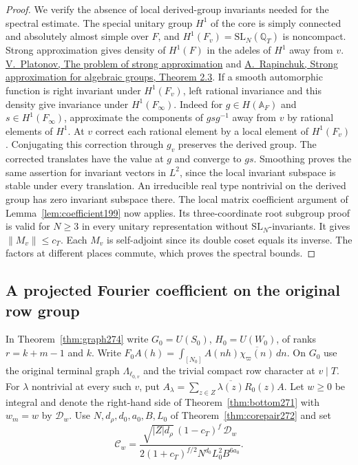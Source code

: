 \documentclass[a4paper,11pt]{article}
\theoremstyle{definition}
\theoremstyle{remark}
\numberwithin{equation}{section}
\begin{document}
\begin{proof}
We verify the absence of local derived-group invariants needed
for the spectral estimate. The special unitary group \(H^1\) of
the core is simply connected and absolutely almost simple over
\(F\), and \(H^1(F_v)=\mathrm{SL}_N(\mathbb Q_T)\) is noncompact.
Strong approximation gives density of \(H^1(F)\) in the adeles
of \(H^1\) away from \(v\).
\href{https://doi.org/10.1070/IM1969v003n06ABEH000838}{V.~Platonov,
The problem of strong approximation} and
\href{https://library.slmath.org/books/Book61/files/70rapi.pdf}{A.~Rapinchuk,
Strong approximation for algebraic groups, Theorem 2.3}.
If a smooth automorphic function is right invariant under
\(H^1(F_v)\), left rational invariance and this density give
invariance under \(H^1(F_\infty)\). Indeed for \(g\in H(\mathbb A_F)\)
and \(s\in H^1(F_\infty)\), approximate the components of
\(gsg^{-1}\) away from \(v\) by rational elements of \(H^1\).
At \(v\) correct each rational element by a local element of
\(H^1(F_v)\). Conjugating this correction through \(g_v\)
preserves the derived group. The corrected translates have
the value at \(g\) and converge to \(gs\). Smoothing proves
the same assertion for invariant vectors in \(L^2\), since
the local invariant subspace is stable under every translation.
An irreducible real type nontrivial on the derived group has
zero invariant subspace there. The local matrix coefficient
argument of Lemma~\ref{lem:coefficient199} now applies. Its
three-coordinate root subgroup proof is valid for \(N\ge3\)
in every unitary representation without \(\mathrm{SL}_N\)-invariants.
It gives \(\|M_v\|\le c_T\). Each \(M_v\) is self-adjoint since
its double coset equals its inverse. The factors at different
places commute, which proves the spectral bounds.
\end{proof}

\subsection{A projected Fourier coefficient on the original row group}\label{nav:VII-46}
In Theorem~\ref{thm:graph274} write \(G_0=U(S_0)\),
\(H_0=U(W_0)\), of ranks \(r=k+m-1\) and \(k\). Write
\(F_0 A(h)=\int_{[N_0]} A(nh)\overline{\chi_\varpi(n)}\,dn\).
On \(G_0\) use the original terminal graph \(\Lambda_{\ell_{0,v}}\)
and the trivial compact row character at \(v\mid T\).
For \(\lambda\) nontrivial at every such \(v\), put
\(A_\lambda=\sum_{z\in Z}\overline{\lambda(z)}R_0(z)A\).
Let \(w\ge0\) be integral and denote the right-hand side of
Theorem~\ref{thm:bottom271} with \(w_m=w\) by \(\mathcal D_w\).
Use \(N,d_\rho,d_0,a_0,B,L_0\) of Theorem~\ref{thm:corepair272}
and set
\[
 \mathcal C_w=
 \frac{\sqrt{|Z|d_\rho}\,(1-c_T)^f\,\mathcal D_w}
 {2(1+c_T)^{f/2}N^{d_0}L_0^2 B^{6a_0}} .
\]
\end{document}

